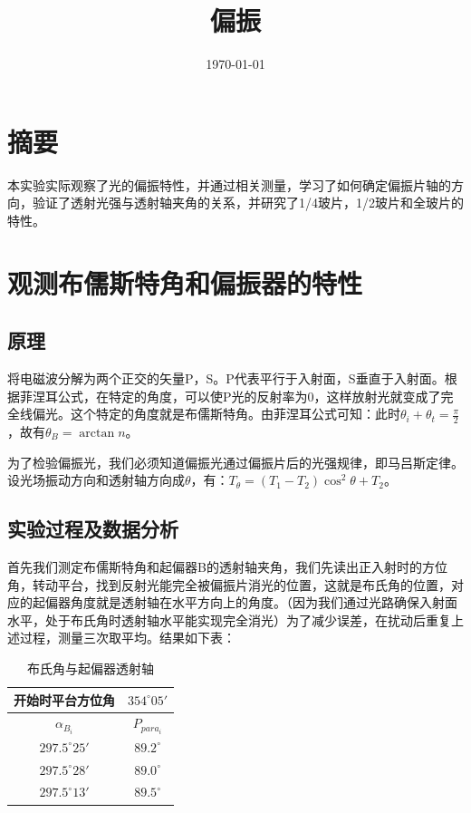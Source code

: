 \documentclass[12pt]{article}
\title{偏振}
\author{}
\date{\today}
\begin{document}
\maketitle
\setlength{\parindent}{2em}

\section*{摘要}

本实验实际观察了光的偏振特性，并通过相关测量，学习了如何确定偏振片轴的方向，验证了透射光强与透射轴夹角的关系，并研究了1/4玻片，1/2玻片和全玻片的特性。

\section{观测布儒斯特角和偏振器的特性}

\subsection{原理}

将电磁波分解为两个正交的矢量P，S。P代表平行于入射面，S垂直于入射面。根据菲涅耳公式，在特定的角度，可以使P光的反射率为0，这样放射光就变成了完全线偏光。这个特定的角度就是布儒斯特角。由菲涅耳公式可知：此时$\theta_i + \theta_t = \frac{\pi}{2}$，故有$\theta_B = \arctan{n}$。

为了检验偏振光，我们必须知道偏振光通过偏振片后的光强规律，即马吕斯定律。设光场振动方向和透射轴方向成$\theta$，有：$T_{\theta} = (T_1-T_2)\cos^2{\theta}+T_2$。

\subsection{实验过程及数据分析}

首先我们测定布儒斯特角和起偏器B的透射轴夹角，我们先读出正入射时的方位角，转动平台，找到反射光能完全被偏振片消光的位置，这就是布氏角的位置，对应的起偏器角度就是透射轴在水平方向上的角度。（因为我们通过光路确保入射面水平，处于布氏角时透射轴水平能实现完全消光）为了减少误差，在扰动后重复上述过程，测量三次取平均。结果如下表：

\begin{table}[H]
    \centering
    \begin{tabular}{|c|c|}
    \hline
    开始时平台方位角          & $354^\circ 05'$ \\ \hline
    $\alpha_{B_i}$    & $P_{para_i}$    \\ \hline
    $297.5^\circ 25'$ & $89.2^\circ$    \\ \hline
    $297.5^\circ 28'$ & $89.0^\circ$   \\ \hline
    $297.5^\circ 13'$ & $89.5^\circ$    \\ \hline
    \end{tabular}
    \caption{布氏角与起偏器透射轴}
    \label{tab:A1}
\end{table}
\end{document}

